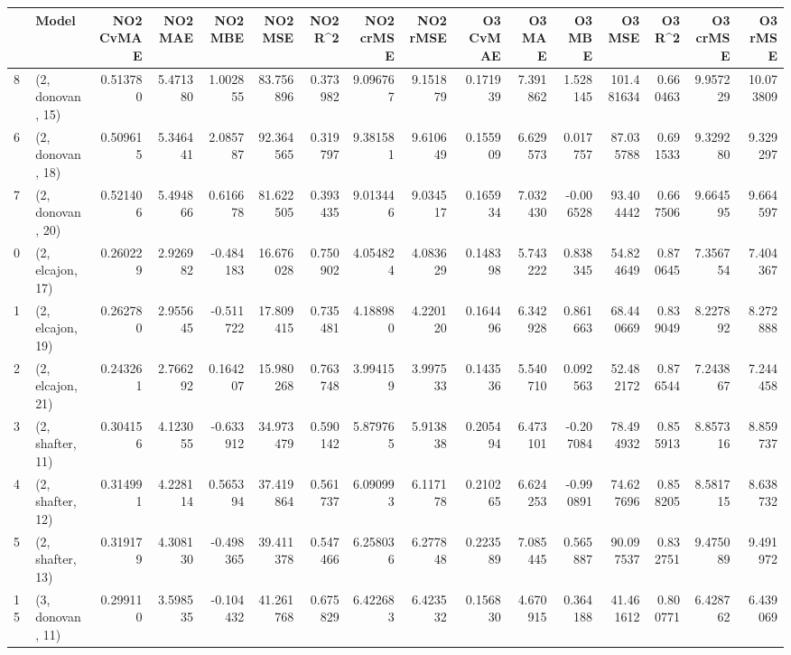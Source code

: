 \begin{tabular}{llrrrrrrrrrrrrrr}
\toprule
{} &             Model &  NO2 CvMAE &   NO2 MAE &   NO2 MBE &    NO2 MSE &   NO2 R\textasciicircum2 &  NO2 crMSE &  NO2 rMSE &  O3 CvMAE &    O3 MAE &    O3 MBE &      O3 MSE &    O3 R\textasciicircum2 &   O3 crMSE &    O3 rMSE \\
\midrule
8  &  (2, donovan, 15) &   0.513780 &  5.471380 &  1.002855 &  83.756896 &  0.373982 &   9.096767 &  9.151879 &  0.171939 &  7.391862 &  1.528145 &  101.481634 &  0.660463 &   9.957229 &  10.073809 \\
6  &  (2, donovan, 18) &   0.509615 &  5.346441 &  2.085787 &  92.364565 &  0.319797 &   9.381581 &  9.610649 &  0.155909 &  6.629573 &  0.017757 &   87.035788 &  0.691533 &   9.329280 &   9.329297 \\
7  &  (2, donovan, 20) &   0.521406 &  5.494866 &  0.616678 &  81.622505 &  0.393435 &   9.013446 &  9.034517 &  0.165934 &  7.032430 & -0.006528 &   93.404442 &  0.667506 &   9.664595 &   9.664597 \\
0  &  (2, elcajon, 17) &   0.260229 &  2.926982 & -0.484183 &  16.676028 &  0.750902 &   4.054824 &  4.083629 &  0.148398 &  5.743222 &  0.838345 &   54.824649 &  0.870645 &   7.356754 &   7.404367 \\
1  &  (2, elcajon, 19) &   0.262780 &  2.955645 & -0.511722 &  17.809415 &  0.735481 &   4.188980 &  4.220120 &  0.164496 &  6.342928 &  0.861663 &   68.440669 &  0.839049 &   8.227892 &   8.272888 \\
2  &  (2, elcajon, 21) &   0.243261 &  2.766292 &  0.164207 &  15.980268 &  0.763748 &   3.994159 &  3.997533 &  0.143536 &  5.540710 &  0.092563 &   52.482172 &  0.876544 &   7.243867 &   7.244458 \\
3  &  (2, shafter, 11) &   0.304156 &  4.123055 & -0.633912 &  34.973479 &  0.590142 &   5.879765 &  5.913838 &  0.205494 &  6.473101 & -0.207084 &   78.494932 &  0.855913 &   8.857316 &   8.859737 \\
4  &  (2, shafter, 12) &   0.314991 &  4.228114 &  0.565394 &  37.419864 &  0.561737 &   6.090993 &  6.117178 &  0.210265 &  6.624253 & -0.990891 &   74.627696 &  0.858205 &   8.581715 &   8.638732 \\
5  &  (2, shafter, 13) &   0.319179 &  4.308130 & -0.498365 &  39.411378 &  0.547466 &   6.258036 &  6.277848 &  0.223589 &  7.085445 &  0.565887 &   90.097537 &  0.832751 &   9.475089 &   9.491972 \\
15 &  (3, donovan, 11) &   0.299110 &  3.598535 & -0.104432 &  41.261768 &  0.675829 &   6.422683 &  6.423532 &  0.156830 &  4.670915 &  0.364188 &   41.461612 &  0.800771 &   6.428762 &   6.439069 \\

\end{tabular}
